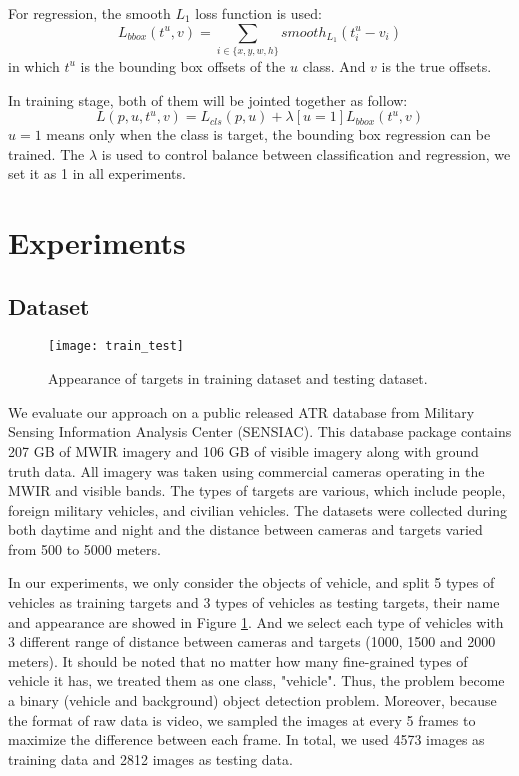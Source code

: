 \documentclass[journal]{IEEEtran}
\begin{document}
For regression, the smooth $L_1$ loss function is used:
\begin{equation}
L_{bbox}(t^u,v) = \sum_{i\in \{x,y,w,h \}} smooth_{L_1}(t^u_i-v_i)
\end{equation}
in which $t^u$ is the bounding box offsets of the $u$ class. And $v$ is the true offsets.

In training stage, both of them will be jointed together as follow:
\begin{equation}
L(p,u,t^u,v) = L_{cls}(p,u) + \lambda[u=1]L_{bbox}(t^u,v)
\end{equation}
$u=1$ means only when the class is target, the bounding box regression can be trained. The $ \lambda$ is used to control balance between classification and regression, we set it as 1 in all experiments.
\section{Experiments}
\subsection{Dataset}
\begin{figure}[tph]
\texttt{[image: train\_test]}
\centering
\caption{Appearance of targets in training dataset and testing dataset.}
\label{train_test}
\end{figure}
 We evaluate our approach on a public released ATR database from Military Sensing Information Analysis Center (SENSIAC). This database package contains 207 GB of MWIR imagery and 106 GB of visible imagery along with ground truth data. All imagery was taken using commercial cameras operating in the MWIR and visible bands. The types of targets are various, which include people, foreign military vehicles, and civilian vehicles. The datasets were collected during both daytime and night and the distance between cameras and targets varied from 500 to 5000 meters.

In our experiments, we only consider the objects of vehicle, and split 5 types of vehicles as training targets and 3 types of vehicles as testing targets, their name and appearance are showed in Figure \ref{train_test}. And we select each type of vehicles with 3 different range of distance between cameras and targets (1000, 1500 and 2000 meters).  It should be noted that no matter how many fine-grained types of vehicle it has, we treated them as one class, "vehicle". Thus, the problem become a binary (vehicle and background) object detection problem. Moreover, because the format of raw data is video, we sampled the images at every 5 frames to maximize the difference between each frame. In total, we used 4573 images as training data and 2812 images as testing data.
\end{document}
